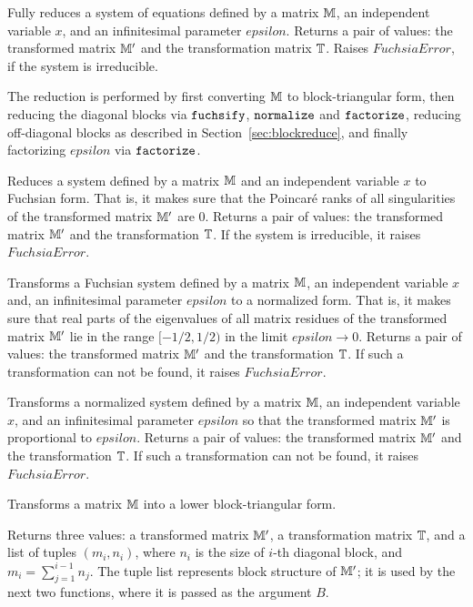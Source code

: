 \documentclass[12pt,a4paper]{article}
\begin{document}
\begin{description}[style=nextline]

Fully reduces a system of equations defined by a matrix $\mathbb{M}$, an independent variable $x$, and an infinitesimal parameter $epsilon$.
Returns a pair of values: the transformed matrix $\mathbb{M}'$ and the transformation matrix $\mathbb{T}$.
Raises $FuchsiaError$, if the system is irreducible.

The reduction is performed by first converting $\mathbb{M}$ to block-triangular form, then reducing the diagonal blocks via $\texttt{fuchsify}$, $\texttt{normalize}$ and $\texttt{factorize}$, reducing off-diagonal blocks as described in Section~\ref{sec:blockreduce}, and finally factorizing $epsilon$ via $\texttt{factorize}$.

Reduces a system defined by a matrix $\mathbb{M}$ and an independent variable $x$ to Fuchsian form.
That is, it makes sure that the Poincar\'e ranks of all singularities of the transformed matrix $\mathbb{M}'$ are $0$.
Returns a pair of values: the transformed matrix $\mathbb{M}'$ and the transformation $\mathbb{T}$.
If the system is irreducible, it raises $FuchsiaError$.

Transforms a Fuchsian system defined by a matrix $\mathbb{M}$, an independent variable $x$ and, an infinitesimal parameter $epsilon$ to a normalized form.
That is, it makes sure that real parts of the eigenvalues of all matrix residues of the transformed matrix $\mathbb{M}'$ lie in the range $[-1/2, 1/2)$ in the limit $epsilon\to0$.
Returns a pair of values: the transformed matrix $\mathbb{M}'$ and the transformation $\mathbb{T}$.
If such a transformation can not be found, it raises $FuchsiaError$.

Transforms a normalized system defined by a matrix $\mathbb{M}$, an independent variable $x$, and an infinitesimal parameter $epsilon$ so that the
transformed matrix $\mathbb{M}'$ is proportional to $epsilon$.
Returns a pair of values: the transformed matrix $\mathbb{M}'$ and the transformation $\mathbb{T}$.
If such a transformation can not be found, it raises $FuchsiaError$.

Transforms a matrix $\mathbb{M}$ into a lower block-triangular form.

Returns three values: a transformed matrix $\mathbb{M}'$, a transformation matrix $\mathbb{T}$, and a list of tuples $(m_i, n_i)$, where $n_i$ is the size of $i$-th diagonal block, and $m_i = \sum_{j=1}^{i-1} n_j$.
The tuple list represents block structure of $\mathbb{M}'$; it is used by the next two functions, where it is passed as the argument $B$.


\end{description}
\end{document}
